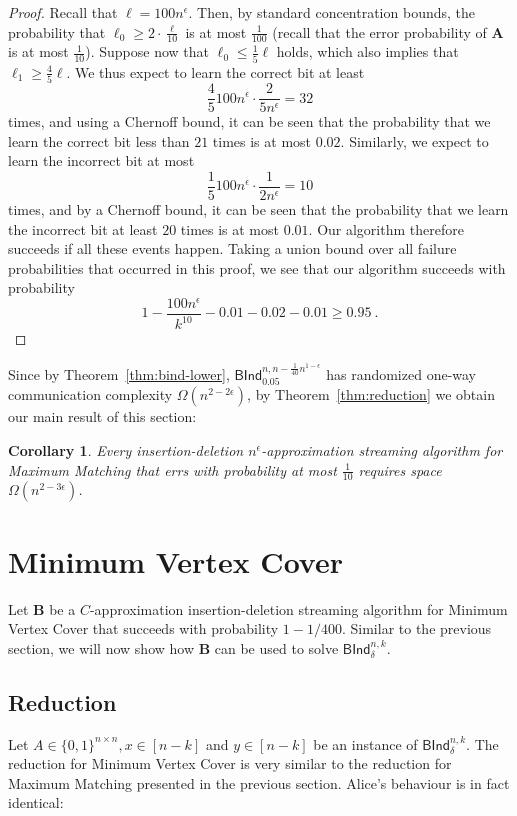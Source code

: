 \documentclass[10pt,a4paper]{article}
\newtheorem{corollary}[theorem]{Corollary}
\begin{document}
\begin{proof}
 Recall that $\ell = 100 n^\epsilon$. Then, by standard concentration bounds, the probability that 
 $\ell_0 \ge 2 \cdot \frac{\ell}{10}$ is at most $\frac{1}{100}$ (recall that the error probability of $\mathbf{A}$ 
 is at most $\frac{1}{10}$). Suppose now that $\ell_0 \le \frac{1}{5} \ell$ holds, which also implies that $\ell_1 \ge \frac{4}{5} \ell$.
 We thus expect to learn the correct bit at least 
 $$\frac{4}{5} 100 n^{\epsilon} \cdot \frac{2}{5 n^\epsilon} = 32$$
 times, and using a Chernoff bound, it can be seen that the probability that we learn the correct bit less than 
 $21$ times is at most $0.02$. 
 Similarly, we expect to learn the incorrect bit at most 
 $$\frac{1}{5} 100 n^{\epsilon} \cdot \frac{1}{2n^\epsilon} = 10$$
 times, and by a Chernoff bound, it can be seen that the probability that we learn the incorrect bit at least $20$ times 
 is at most $ 0.01$. Our algorithm therefore succeeds if all these events happen. Taking a union bound
 over all failure probabilities that occurred in this proof, we see that our algorithm succeeds with probability
 $$1 - \frac{100n^{\epsilon}}{k^{10}} - 0.01 - 0.02 - 0.01 \ge 0.95 \ .$$
\end{proof}

Since by Theorem~\ref{thm:bind-lower}, $\textsf{BInd}^{n,n - \frac{1}{40} n^{1-\epsilon}}_{0.05}$ has randomized one-way 
communication complexity $\Omega(n^{2-2\epsilon})$, by Theorem~\ref{thm:reduction} we obtain our main result of this section:
%
\begin{corollary}
 Every insertion-deletion $n^\epsilon$-approximation streaming algorithm  
 for \textsf{Maximum Matching} that errs with probability at most $\frac{1}{10}$ requires space $\Omega(n^{2-3\epsilon})$.
\end{corollary}




\section{Minimum Vertex Cover} \label{sec:vertex-cover}
Let $\mathbf{B}$ be a $C$-approximation insertion-deletion streaming algorithm for \textsf{Minimum Vertex Cover} that succeeds with
probability $1 - 1/400$. Similar to the previous section, we will now show how $\mathbf{B}$ can be used to solve $\textsf{BInd}^{n,k}_{\delta}$.

\subsection{Reduction}
Let $A \in \{0, 1\}^{n \times n}, x \in [n-k]$ and  $y \in [n-k]$ be an instance of $\textsf{BInd}^{n,k}_{\delta}$. 
The reduction for \textsf{Minimum Vertex Cover} is very similar to the reduction for \textsf{Maximum Matching} presented 
in the previous section. Alice's behaviour is in fact identical: 
\end{document}
